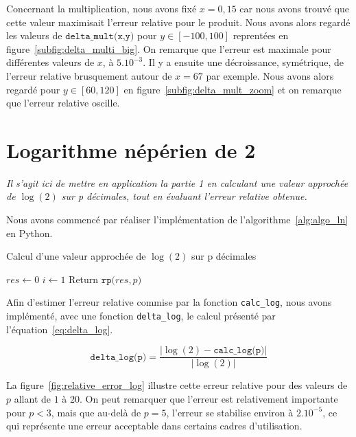 \documentclass{article}
\begin{document}
Concernant la multiplication, nous avons fixé $x = 0,15$ car nous avons trouvé que cette valeur maximisait l'erreur relative pour le produit. Nous avons alors regardé les valeurs de $\texttt{delta\_mult(x,y)}$ pour $y\in[-100,100]$ reprentées en figure~\ref{subfig:delta_multi_big}. On remarque que l'erreur est maximale pour différentes valeurs de $x$, à $5.10^{-3}$. Il y a ensuite une décroissance, symétrique, de l'erreur relative brusquement autour de $x = 67$ par exemple. Nous avons alors regardé pour $y\in[60,120]$ en figure~\ref{subfig:delta_mult_zoom} et on remarque que l'erreur relative oscille.

\section{Logarithme népérien de 2}
\label{sec:ln}

\textit{Il s'agit ici de mettre en application la partie 1 en calculant une valeur approchée de $\log(2)$ sur p d\'ecimales, tout en \'evaluant l'erreur relative obtenue.}
\vskip 1mm ~

Nous avons commencé par réaliser l'implémentation de l'algorithme~\ref{alg:algo_ln} en Python.

\begin{algorithm}
  \caption{Calcul d'une valeur approchée de $\log(2)$ sur p d\'ecimales}
  \label{alg:algo_ln}
  $res \gets 0$\;
  $i \gets 1$\;
  Return $\texttt{rp(}res,p\texttt{)}$\;
\end{algorithm}

Afin d'estimer l'erreur relative commise par la fonction \verb|calc_log|, nous avons implémenté, avec une fonction \verb|delta_log|, le calcul présenté par l'équation~\ref{eq:delta_log}.

\begin{equation}
  \texttt{delta\_log(p)} = \dfrac{\big\vert \log(2) - \texttt{calc\_log(p)} \big\vert}{\big\vert \log(2) \big\vert}
  \label{eq:delta_log}
 \end{equation} 

La figure~\ref{fig:relative_error_log} illustre cette erreur relative pour des valeurs de $p$ allant de $1$ à $20$. On peut remarquer que l'erreur est relativement importante pour $p<3$, mais que au-delà de $p=5$, l'erreur se stabilise environ à $2.10^{-5}$, ce qui représente une erreur acceptable dans certains cadres d'utilisation.
\end{document}
